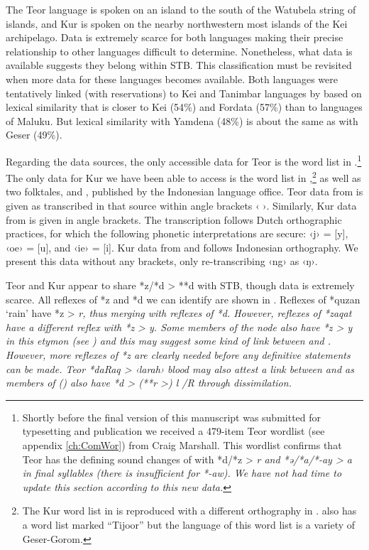 The Teor language is spoken on an island to the south of the
Watubela string of islands,
and Kur is spoken on the nearby northwestern most islands of the Kei archipelago.
Data is extremely scarce for both languages making their precise
relationship to other languages difficult to determine.
Nonetheless, what data is available suggests they belong within STB.
This classification must be revisited when more data for these languages becomes available.
Both languages were tentatively linked (with reservations) to
Kei and Tanimbar languages by \citet{Hughes1987} based on lexical
similarity that is closer to Kei (54{\%})
and Fordata (57{\%}) than to  languages of Maluku.
But lexical similarity with Yamdena (48{\%}) is about the same
as with Geser (49{\%}).

Regarding the data sources,
the only accessible data for Teor is the word list in \citet{Wallace1869}.\footnote{
		Shortly before the final version of this manuscript was
		submitted for typesetting and publication we received a 479-item
		Teor wordlist (see appendix \ref{ch:ComWor}) from Craig Marshall.
		This wordlist confirms that Teor has the defining sound changes
		of  with *d/*z > \it{r} and
		*ə/*a/*-ay > \it{a} in final syllables (there is insufficient for *-aw).
		We have not had time to update this section according to this new data.}
The only data for Kur we have been able to access is the word list
in \citet[108--114]{vonRosenberg1867},\footnote{
		The Kur word list
		in \citet{vonRosenberg1867} is reproduced with a
		different orthography in \citet[600--613]{vonRosenberg1878}.
		\citet{vonRosenberg1867,vonRosenberg1867} also has a word list
		marked “Tijoor” but the language of this word list is a variety
		of Geser-Gorom.}
as well as two folktales,
\citet{Ohoiwutun2021} and \citet{Rado2021},
published by the Indonesian language office.
Teor data from \citet{Wallace1869} is given as transcribed in
that source within angle brackets ‹ ›.
Similarly, Kur data from \citet{vonRosenberg1867} is given in angle brackets.
The transcription follows Dutch orthographic practices,
for which the following phonetic interpretations are secure:
‹j› = [y], ‹oe› = [u], and ‹ie› = [i].
Kur data from \citet{Ohoiwutun2021}
and \citet{Rado2021} follows Indonesian orthography.
We present this data without any brackets,
only re-transcribing ‹ng› as ‹ŋ›.

Teor and Kur appear to share *z/*d > **d with STB,
though data is extremely scarce.
All reflexes of *z
and *d we can identify are shown in .
Reflexes of *quzan ‘rain’ have *z > \it{r},
thus merging with reflexes of *d.
However, reflexes of *zaqat have a different reflex with *z > \it{y}.
Some members of the  node also have *z
> \it{y} in this etymon (see )
and this may suggest some kind of link
between  and .
However, more reflexes of *z are clearly needed before any definitive
statements can be made.
Teor *daRaq > ‹larah› blood may also attest a link between
 and  as members of 
() also have *d > (**r >) \it{l} /{\gap}R through dissimilation.

